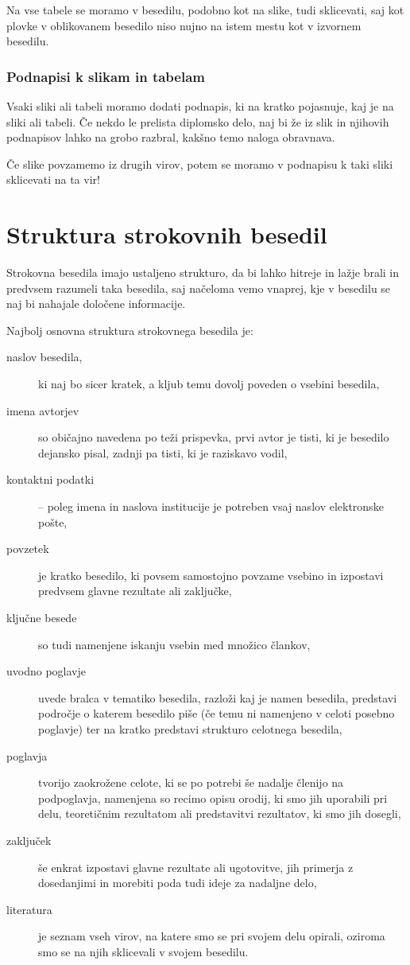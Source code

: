 \documentclass[a4paper, 12pt]{book}
\begin{document}
Na vse tabele se moramo v besedilu, podobno kot na slike, tudi sklicevati, saj kot plovke v oblikovanem besedilo niso nujno na istem mestu kot v izvornem besedilu.


\subsection{Podnapisi k slikam in tabelam}

Vsaki sliki ali tabeli moramo dodati podnapis, ki na kratko pojasnuje, kaj je na sliki ali tabeli. 
Če nekdo le prelista diplomsko delo, naj bi že iz slik in njihovih podnapisov lahko na grobo razbral, kakšno temo naloga obravnava.

Če slike povzamemo iz drugih virov, potem se moramo v podnapisu k taki sliki sklicevati na ta vir!


\chapter{Struktura strokovnih besedil}
\label{stroka}

Strokovna besedila imajo ustaljeno strukturo, da bi lahko hitreje in lažje brali in predvsem razumeli taka besedila, saj načeloma vemo vnaprej, 
kje v besedilu se naj bi nahajale določene informacije.

Najbolj osnovna struktura strokovnega besedila je:
\begin{description}
\item[naslov besedila,] ki naj bo sicer kratek, a kljub temu dovolj poveden o vsebini besedila,
\item[imena avtorjev] so običajno navedena po teži prispevka, prvi avtor je tisti, ki je besedilo dejansko pisal, zadnji pa tisti, ki je raziskavo vodil,
\item[kontaktni podatki] -- poleg imena in naslova institucije je potreben vsaj naslov elektronske pošte,
\item[povzetek] je kratko besedilo, ki povsem samostojno povzame vsebino in izpostavi predvsem  glavne rezultate ali zaključke,
\item[ključne besede] so tudi namenjene iskanju vsebin med množico člankov,
\item[uvodno poglavje] uvede bralca v tematiko besedila, razloži kaj je namen besedila, predstavi področje o katerem besedilo piše 
(če temu ni namenjeno v celoti posebno poglavje) ter na kratko predstavi strukturo celotnega besedila,
\item[poglavja] tvorijo zaokrožene celote, ki se po potrebi še nadalje členijo na podpoglavja, namenjena so recimo opisu orodij, 
ki smo jih uporabili pri delu, teoretičnim rezultatom ali predstavitvi rezultatov, ki smo jih dosegli,
\item[zaključek] še enkrat izpostavi glavne rezultate ali ugotovitve, jih primerja z dosedanjimi in morebiti poda tudi ideje za nadaljne delo,
\item[literatura] je seznam vseh virov, na katere smo se pri svojem delu opirali, oziroma smo se na njih sklicevali v svojem besedilu.
\end{description}
\end{document}
